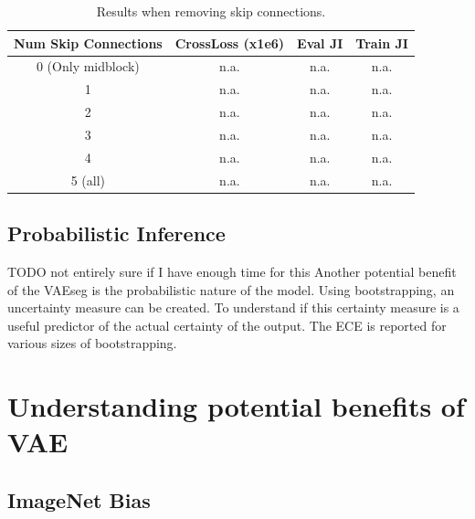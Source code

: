 \begin{table}[!ht]
    \centering
    \caption{Results when removing skip connections.}
    \label{tab:abl-skip-connection}
    \begin{tabular}{cccc}
        \hline
        Num Skip Connections & CrossLoss (x1e6) & Eval JI & Train JI \\
        \hline
        0 (Only midblock)    & n.a.             & n.a.    & n.a.     \\
        1                    & n.a.             & n.a.    & n.a.     \\
        2                    & n.a.             & n.a.    & n.a.     \\
        3                    & n.a.             & n.a.    & n.a.     \\
        4                    & n.a.             & n.a.    & n.a.     \\
        5 (all)              & n.a.             & n.a.    & n.a.     \\
        \hline
    \end{tabular}
\end{table}

\subsection{Probabilistic Inference}
TODO not entirely sure if I have enough time for this
Another potential benefit of the VAEseg is the probabilistic nature of the model. Using bootstrapping, an uncertainty measure can be created. To understand if this certainty measure is a useful predictor of the actual certainty of the output. The ECE is reported for various sizes of bootstrapping.

\section{Understanding potential benefits of VAE}
\subsection*{ImageNet Bias}



